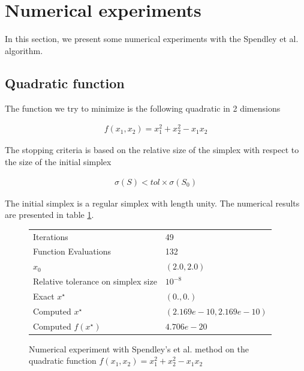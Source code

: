 \section{Numerical experiments}

In this section, we present some numerical experiments 
with the Spendley et al. algorithm.

\subsection{Quadratic function}

The function we try to minimize is the following quadratic 
in 2 dimensions 

\begin{eqnarray}
f(x_1,x_2) = x_1^2 + x_2^2 - x_1 x_2
\end{eqnarray}

The stopping criteria is based on the relative size of the simplex 
with respect to the size of the initial simplex 

\begin{eqnarray}
\sigma(S) < tol \times \sigma(S_0)
\end{eqnarray}

The initial simplex is a regular simplex with length unity.
The numerical results are presented in table \ref{fig-spendley-numexp1-table}.

\begin{figure}[htbp]
\begin{center}
\begin{tiny}
\begin{tabular}{|l|l|}
\hline
Iterations & 49 \\
Function Evaluations & 132 \\
$x_0$ & $(2.0,2.0)$ \\
Relative tolerance on simplex size & $10^{-8}$ \\
Exact $x^\star$ & $(0.,0.)$\\
Computed $x^\star$ & $(2.169e-10, 2.169e-10)$\\
Computed $f(x^\star)$ & $4.706e-20$\\
\hline
\end{tabular}
\end{tiny}
\end{center}
\caption{Numerical experiment with Spendley's et al. method on the quadratic function
$f(x_1,x_2) = x_1^2 + x_2^2 - x_1 x_2$}
\label{fig-spendley-numexp1-table}
\end{figure}


